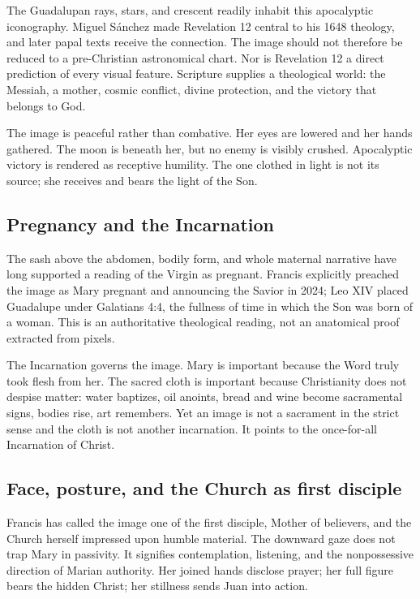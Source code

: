 The Guadalupan rays, stars, and crescent readily inhabit this apocalyptic iconography. Miguel Sánchez made Revelation 12 central to his 1648 theology, and later papal texts receive the connection. The image should not therefore be reduced to a pre-Christian astronomical chart. Nor is Revelation 12 a direct prediction of every visual feature. Scripture supplies a theological world: the Messiah, a mother, cosmic conflict, divine protection, and the victory that belongs to God.

The image is peaceful rather than combative. Her eyes are lowered and her hands gathered. The moon is beneath her, but no enemy is visibly crushed. Apocalyptic victory is rendered as receptive humility. The one clothed in light is not its source; she receives and bears the light of the Son.

\subsection{Pregnancy and the Incarnation}

The sash above the abdomen, bodily form, and whole maternal narrative have long supported a reading of the Virgin as pregnant. Francis explicitly preached the image as Mary pregnant and announcing the Savior in 2024; Leo XIV placed Guadalupe under Galatians 4:4, the fullness of time in which the Son was born of a woman. This is an authoritative theological reading, not an anatomical proof extracted from pixels.

The Incarnation governs the image. Mary is important because the Word truly took flesh from her. The sacred cloth is important because Christianity does not despise matter: water baptizes, oil anoints, bread and wine become sacramental signs, bodies rise, art remembers. Yet an image is not a sacrament in the strict sense and the cloth is not another incarnation. It points to the once-for-all Incarnation of Christ.

\subsection{Face, posture, and the Church as first disciple}

Francis has called the image one of the first disciple, Mother of believers, and the Church herself impressed upon humble material. The downward gaze does not trap Mary in passivity. It signifies contemplation, listening, and the nonpossessive direction of Marian authority. Her joined hands disclose prayer; her full figure bears the hidden Christ; her stillness sends Juan into action.

